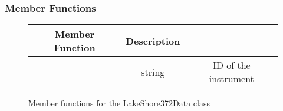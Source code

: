 \documentclass{article}
\begin{document}
\subsubsection{Member Functions}
\begin{figure}[H]
\centering\begin{tabular}{c | c | c }
Member Function & Description \\ \hline \hline
 & string & ID of the instrument \\
\end{tabular}
\caption{Member functions for the LakeShore372Data class}
\end{figure}
\end{document}
